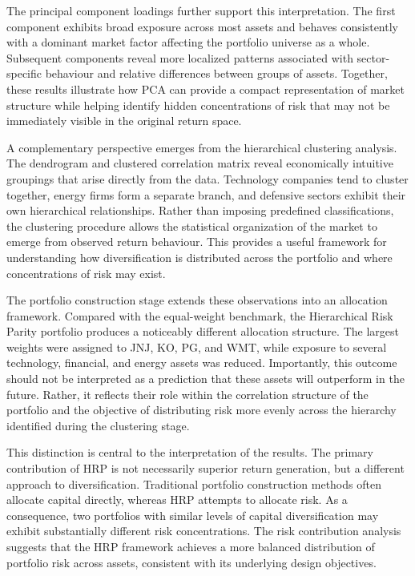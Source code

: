\documentclass[
  12pt,
  letterpaper,
]{book}
\begin{document}
The principal component loadings further support this interpretation.
The first component exhibits broad exposure across most assets and
behaves consistently with a dominant market factor affecting the
portfolio universe as a whole. Subsequent components reveal more
localized patterns associated with sector-specific behaviour and
relative differences between groups of assets. Together, these results
illustrate how PCA can provide a compact representation of market
structure while helping identify hidden concentrations of risk that may
not be immediately visible in the original return space.

A complementary perspective emerges from the hierarchical clustering
analysis. The dendrogram and clustered correlation matrix reveal
economically intuitive groupings that arise directly from the data.
Technology companies tend to cluster together, energy firms form a
separate branch, and defensive sectors exhibit their own hierarchical
relationships. Rather than imposing predefined classifications, the
clustering procedure allows the statistical organization of the market
to emerge from observed return behaviour. This provides a useful
framework for understanding how diversification is distributed across
the portfolio and where concentrations of risk may exist.

The portfolio construction stage extends these observations into an
allocation framework. Compared with the equal-weight benchmark, the
Hierarchical Risk Parity portfolio produces a noticeably different
allocation structure. The largest weights were assigned to JNJ, KO, PG,
and WMT, while exposure to several technology, financial, and energy
assets was reduced. Importantly, this outcome should not be interpreted
as a prediction that these assets will outperform in the future. Rather,
it reflects their role within the correlation structure of the portfolio
and the objective of distributing risk more evenly across the hierarchy
identified during the clustering stage.

This distinction is central to the interpretation of the results. The
primary contribution of HRP is not necessarily superior return
generation, but a different approach to diversification. Traditional
portfolio construction methods often allocate capital directly, whereas
HRP attempts to allocate risk. As a consequence, two portfolios with
similar levels of capital diversification may exhibit substantially
different risk concentrations. The risk contribution analysis suggests
that the HRP framework achieves a more balanced distribution of
portfolio risk across assets, consistent with its underlying design
objectives.
\end{document}
